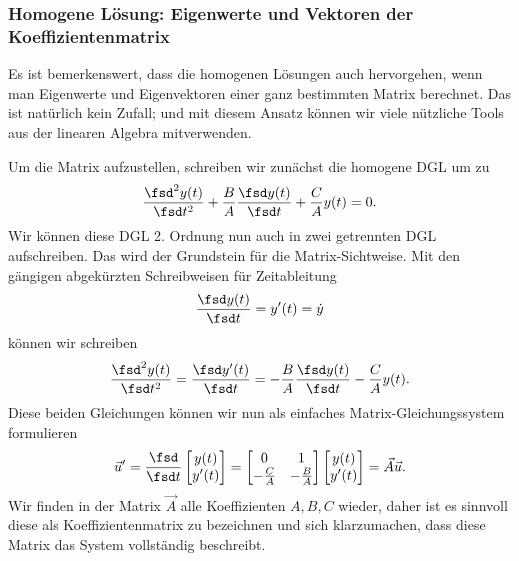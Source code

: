 \subsubsection{Homogene Lösung: Eigenwerte und Vektoren der Koeffizientenmatrix}
%
Es ist bemerkenswert, dass die homogenen Lösungen
auch hervorgehen, wenn man Eigenwerte und Eigenvektoren einer ganz bestimmten Matrix
berechnet. Das ist natürlich kein Zufall; und mit diesem Ansatz können wir viele
nützliche Tools aus der linearen Algebra mitverwenden.

Um die Matrix aufzustellen, schreiben wir zunächst die homogene DGL um zu
\begin{align}
\frac{\fsd^2 y(t)}{\fsd t^2} + \frac{B}{A} \frac{\fsd y(t)}{\fsd t} + \frac{C}{A} y(t) = 0.
\end{align}
%
Wir können diese DGL 2. Ordnung nun auch in zwei getrennten DGL aufschreiben. Das wird
der Grundstein für die Matrix-Sichtweise.
%
Mit den gängigen abgekürzten Schreibweisen für Zeitableitung
\begin{align}
\frac{\fsd y(t)}{\fsd t} = y'(t) = \dot{y}
\end{align}
können wir schreiben
\begin{align}
\frac{\fsd^2 y(t)}{\fsd t^2} = \frac{\fsd y'(t)}{\fsd t} = - \frac{B}{A}  \frac{\fsd y(t)}{\fsd t} - \frac{C}{A}  y(t).
\end{align}
%
Diese beiden Gleichungen können wir nun als einfaches Matrix-Gleichungssystem formulieren
\begin{align}
\label{eq:A7BEE9E24E_uAU}
\vec{u}' = \frac{\fsd}{\fsd t}
\begin{bmatrix}
y(t) \\ y'(t)
\end{bmatrix}
=
\begin{bmatrix}
0 & 1 \\ - \frac{C}{A} & - \frac{B}{A}
\end{bmatrix}
\begin{bmatrix}
y(t) \\ y'(t)
\end{bmatrix}
=
\vec{A} \vec{u}.
\end{align}
%
Wir finden in der Matrix $\vec{A}$ alle Koeffizienten $A,B,C$ wieder, daher
ist es sinnvoll diese als Koeffizientenmatrix zu bezeichnen und sich klarzumachen,
dass diese Matrix das System vollständig beschreibt.

